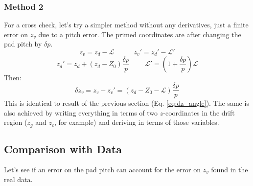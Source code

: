 \documentclass[amsmath,amssymb,notitlepage,11pt]{revtex4-1}
\begin{document}
\subsubsection{Method 2}
For a cross check, let's try a simpler method without any derivatives, just a finite error on $z_v$ due to a pitch error.  The primed coordinates are after changing the pad pitch by $\delta p$.
\begin{equation}
    z_v=z_d-\mathcal{L} \ \ \ \ \ \ \ \ \ \ \ \ \   z_v'=z_d'-\mathcal{L}'
    \label{}
\end{equation}
\begin{equation}
    z_d' = z_d + (z_d-Z_0)\frac{\delta p}{p}\ \ \ \  \ \ \ \ \ \     \mathcal{L}'=(1+\frac{\delta p}{p})\mathcal{L}
    \label{}
\end{equation}
Then:
\begin{equation}
    \delta z_v=z_v-z_v'=(z_d-Z_0-\mathcal{L})\frac{\delta p}{p}
    \label{}
\end{equation}
This is identical to result of the previous section (Eq. \ref{eq:dz_angle}).  The same is also achieved by writing everything in terms of two $z$-coordinates in the drift region ($z_g$ and $z_c$, for example) and deriving in terms of those variables.

\subsection{Comparison with Data}
Let's see if an error on the pad pitch can account for the error on $z_v$ found in the real data.
\end{document}
